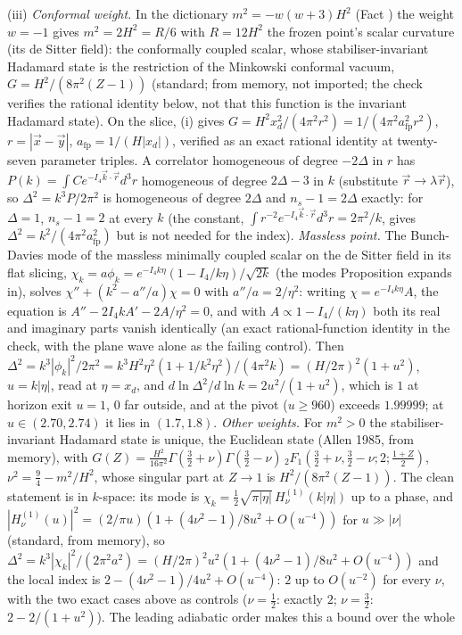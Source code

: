 (iii) \emph{Conformal weight.} In the dictionary $m^{2} = -w(w+3)H^{2}$ (Fact ) the weight $w = -1$ gives $m^{2} = 2H^{2} = R/6$ with $R = 12H^{2}$ the frozen point's scalar curvature (its de Sitter field): the conformally coupled scalar, whose stabiliser-invariant Hadamard state is the restriction of the Minkowski conformal vacuum, $G = H^{2}/(8\pi^{2}(Z - 1))$ (standard; from memory, not imported; the check verifies the rational identity below, not that this function is the invariant Hadamard state). On the slice, (i) gives $G = H^{2}x_{d}^{2}/(4\pi^{2}r^{2}) = 1/(4\pi^{2}a_{\mathrm{fp}}^{2}r^{2})$, $r = |\vec x - \vec y|$, $a_{\mathrm{fp}} = 1/(H|x_{d}|)$, verified as an exact rational identity at twenty-seven parameter triples. A correlator homogeneous of degree $-2\Delta$ in $r$ has $P(k) = \int C e^{-I_4\vec k\cdot\vec r}d^{3}r$ homogeneous of degree $2\Delta - 3$ in $k$ (substitute $\vec r \to \lambda\vec r$), so $\Delta^{2} = k^{3}P/2\pi^{2}$ is homogeneous of degree $2\Delta$ and $n_{s} - 1 = 2\Delta$ exactly: for $\Delta = 1$, $n_{s} - 1 = 2$ at every $k$ (the constant, $\int r^{-2}e^{-I_4\vec k\cdot\vec r}d^{3}r = 2\pi^{2}/k$, gives $\Delta^{2} = k^{2}/(4\pi^{2}a_{\mathrm{fp}}^{2})$ but is not needed for the index). \emph{Massless point.} The Bunch-Davies mode of the massless minimally coupled scalar on the de Sitter field in its flat slicing, $\chi_{k} = a\phi_{k} = e^{-I_4k\eta}(1 - I_4/k\eta)/\sqrt{2k}$ (the modes Proposition  expands in), solves $\chi'' + (k^{2} - a''/a)\chi = 0$ with $a''/a = 2/\eta^{2}$: writing $\chi = e^{-I_4k\eta}A$, the equation is $A'' - 2I_4kA' - 2A/\eta^{2} = 0$, and with $A \propto 1 - I_4/(k\eta)$ both its real and imaginary parts vanish identically (an exact rational-function identity in the check, with the plane wave alone as the failing control). Then $\Delta^{2} = k^{3}|\phi_{k}|^{2}/2\pi^{2} = k^{3}H^{2}\eta^{2}(1 + 1/k^{2}\eta^{2})/(4\pi^{2}k) = (H/2\pi)^{2}(1 + u^{2})$, $u = k|\eta|$, read at $\eta = x_{d}$, and $d\ln\Delta^{2}/d\ln k = 2u^{2}/(1 + u^{2})$, which is $1$ at horizon exit $u = 1$, $0$ far outside, and at the pivot ($u \ge 960$) exceeds $1.99999$; at $u \in (2.70, 2.74)$ it lies in $(1.7, 1.8)$. \emph{Other weights.} For $m^{2} > 0$ the stabiliser-invariant Hadamard state is unique, the Euclidean state (Allen 1985, from memory), with $G(Z) = \tfrac{H^{2}}{16\pi^{2}}\Gamma(\tfrac32 + \nu)\Gamma(\tfrac32 - \nu)\,{}_{2}F_{1}(\tfrac32 + \nu, \tfrac32 - \nu; 2; \tfrac{1 + Z}{2})$, $\nu^{2} = \tfrac94 - m^{2}/H^{2}$, whose singular part at $Z \to 1$ is $H^{2}/(8\pi^{2}(Z-1))$. The clean statement is in $k$-space: its mode is $\chi_{k} = \tfrac12\sqrt{\pi|\eta|}\,H^{(1)}_{\nu}(k|\eta|)$ up to a phase, and $|H^{(1)}_{\nu}(u)|^{2} = (2/\pi u)(1 + (4\nu^{2} - 1)/8u^{2} + O(u^{-4}))$ for $u \gg |\nu|$ (standard, from memory), so $\Delta^{2} = k^{3}|\chi_{k}|^{2}/(2\pi^{2}a^{2}) = (H/2\pi)^{2}u^{2}(1 + (4\nu^{2} - 1)/8u^{2} + O(u^{-4}))$ and the local index is $2 - (4\nu^{2} - 1)/4u^{2} + O(u^{-4})$: $2$ up to $O(u^{-2})$ for every $\nu$, with the two exact cases above as controls ($\nu = \tfrac12$: exactly $2$; $\nu = \tfrac32$: $2 - 2/(1 + u^{2})$). The leading adiabatic order makes this a bound over the whole 